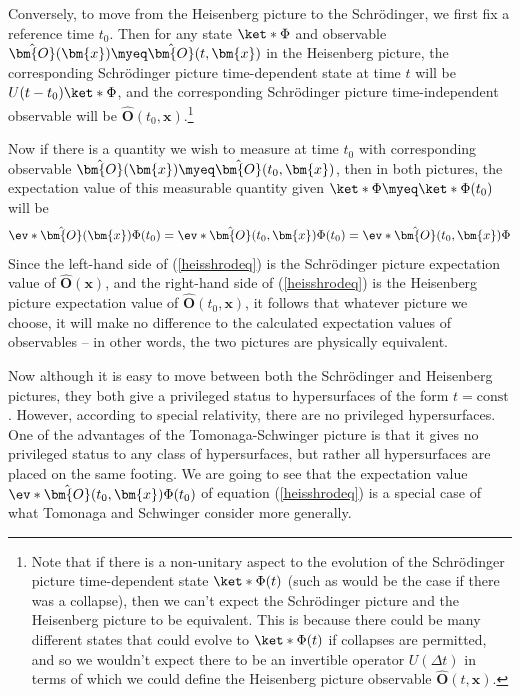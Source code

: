 \documentclass[12pt]{report}
\begin{document}
Conversely, to move from the Heisenberg picture to the Schr\"{o}dinger, we first fix a reference time $t_0$. Then for any state $\ket*{\Phi}$ and observable $\hat{\bm{O}}(\bm{x})\myeq\hat{\bm{O}}(t, \bm{x})$ in the Heisenberg picture, the corresponding Schr\"{o}dinger picture time-dependent state at time $t$ will be $U(t-t_0)\ket*{\Phi}$, and the corresponding Schr\"{o}dinger picture time-independent observable will be $\hat{\bm{O}}(t_0, \bm{x})$.\footnote{Note that if there is a non-unitary aspect to the evolution of the Schr\"{o}dinger picture time-dependent state $\ket*{\Phi(t)}$ (such as would be the case if there was a collapse), then we can't expect the Schr\"{o}dinger picture and the Heisenberg picture to be equivalent. This is because there could be many different states that could evolve to $\ket*{\Phi(t)}$ if collapses are permitted, and so we wouldn't expect there to be an invertible operator $U(\Delta t)$ in terms of which we could define the Heisenberg picture observable  $\hat{\bm{O}}(t, \bm{x})$.  }

Now if there is a quantity we wish to measure at time $t_0$ with corresponding observable $\hat{\bm{O}}(\bm{x})\myeq\hat{\bm{O}}(t_0, \bm{x})$, then in both pictures, the expectation value of this measurable quantity given $\ket*{\Phi}\myeq\ket*{\Phi(t_0)}$ will be 
\begin{equation}\label{heisshrodeq}
  \ev*{\hat{\bm{O}}(\bm{x})}{\Phi(t_0)}=\ev*{\hat{\bm{O}}(t_0,\bm{x})}{\Phi(t_0)}=\ev*{\hat{\bm{O}}(t_0, \bm{x})}{\Phi}
\end{equation}
Since the left-hand side of (\ref{heisshrodeq}) is the Schr\"{o}dinger picture expectation value of $\hat{\bm{O}}(\bm{x})$, and the right-hand side of (\ref{heisshrodeq}) is the Heisenberg picture expectation value of $\hat{\bm{O}}(t_0,\bm{x})$, it follows that whatever picture we choose, it will make no difference to the calculated expectation values of observables -- in other words, the two pictures are physically equivalent.

Now although it is easy to move between both the Schr\"{o}dinger and Heisenberg pictures, they both give a privileged status to hypersurfaces of the form $t=\text{const}$. However, according to special relativity, there are no privileged hypersurfaces. One of the advantages of the Tomonaga-Schwinger picture is that it gives no privileged status to any class of hypersurfaces, but rather all hypersurfaces are placed on the same footing. We are going to see that the expectation value $\ev*{\hat{\bm{O}}(t_0,\bm{x})}{\Phi(t_0)}$  of equation (\ref{heisshrodeq}) is a special case of what Tomonaga and Schwinger consider more generally. 
\end{document}
